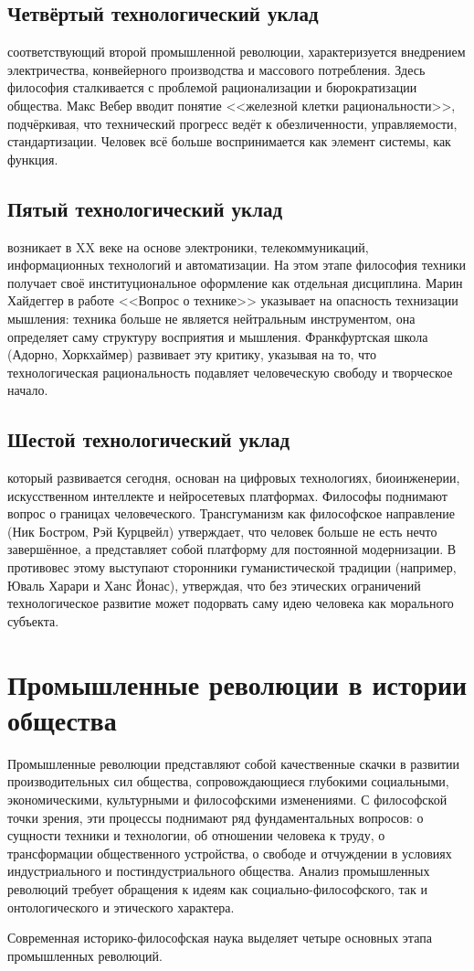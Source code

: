 \documentclass[12pt,a4paper]{article}
\begin{document}
	\subsection{Четвёртый технологический уклад}
	соответствующий второй промышленной революции, характеризуется внедрением электричества, конвейерного производства и массового потребления. Здесь философия сталкивается с проблемой рационализации и бюрократизации общества. Макс Вебер вводит понятие <<железной клетки рациональности>>, подчёркивая, что технический прогресс ведёт к обезличенности, управляемости, стандартизации. Человек всё больше воспринимается как элемент системы, как функция.
	
	\subsection{Пятый технологический уклад}
	возникает в XX веке на основе электроники, телекоммуникаций, информационных технологий и автоматизации. На этом этапе философия техники получает своё институциональное оформление как отдельная дисциплина. Марин Хайдеггер в работе <<Вопрос о технике>> указывает на опасность технизации мышления: техника больше не является нейтральным инструментом, она определяет саму структуру восприятия и мышления. Франкфуртская школа (Адорно, Хоркхаймер) развивает эту критику, указывая на то, что технологическая рациональность подавляет человеческую свободу и творческое начало.
	
	\subsection{Шестой технологический уклад}
	который развивается сегодня, основан на цифровых технологиях, биоинженерии, искусственном интеллекте и нейросетевых платформах. Философы поднимают вопрос о границах человеческого. Трансгуманизм как философское направление (Ник Бостром, Рэй Курцвейл) утверждает, что человек больше не есть нечто завершённое, а представляет собой платформу для постоянной модернизации. В противовес этому выступают сторонники гуманистической традиции (например, Юваль Харари и Ханс Йонас), утверждая, что без этических ограничений технологическое развитие может подорвать саму идею человека как морального субъекта.
	
	\section{Промышленные революции в истории общества~\checkmark}
	\par Промышленные революции представляют собой качественные скачки в развитии производительных сил общества, сопровождающиеся глубокими социальными, экономическими, культурными и философскими изменениями. С философской точки зрения, эти процессы поднимают ряд фундаментальных вопросов: о сущности техники и технологии, об отношении человека к труду, о трансформации общественного устройства, о свободе и отчуждении в условиях индустриального и постиндустриального общества. Анализ промышленных революций требует обращения к идеям как социально-философского, так и онтологического и этического характера.
	\par Современная историко-философская наука выделяет четыре основных этапа промышленных революций.
\end{document}
